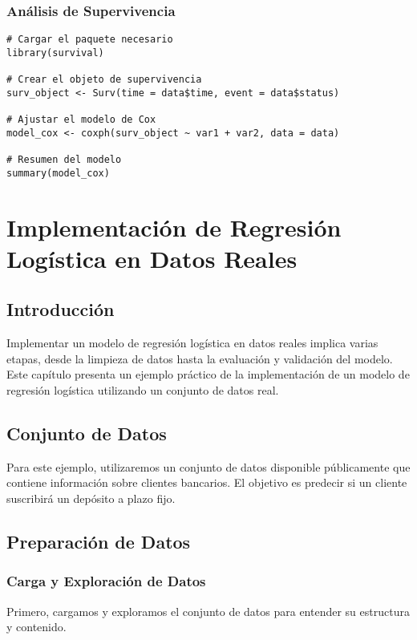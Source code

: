 \documentclass[a4paper]{report} %
\begin{document}
\subsection{An\'alisis de Supervivencia}

\begin{verbatim}
# Cargar el paquete necesario
library(survival)

# Crear el objeto de supervivencia
surv_object <- Surv(time = data$time, event = data$status)

# Ajustar el modelo de Cox
model_cox <- coxph(surv_object ~ var1 + var2, data = data)

# Resumen del modelo
summary(model_cox)
\end{verbatim}



\chapter{Implementación de Regresión Logística en Datos Reales}
\section{Introducci\'on}

Implementar un modelo de regresi\'on log\'istica en datos reales implica varias etapas, desde la limpieza de datos hasta la evaluaci\'on y validaci\'on del modelo. Este cap\'itulo presenta un ejemplo pr\'actico de la implementaci\'on de un modelo de regresi\'on log\'istica utilizando un conjunto de datos real.

\section{Conjunto de Datos}

Para este ejemplo, utilizaremos un conjunto de datos disponible p\'ublicamente que contiene informaci\'on sobre clientes bancarios. El objetivo es predecir si un cliente suscribir\'a un dep\'osito a plazo fijo.

\section{Preparaci\'on de Datos}

\subsection{Carga y Exploraci\'on de Datos}

Primero, cargamos y exploramos el conjunto de datos para entender su estructura y contenido.
\end{document}

